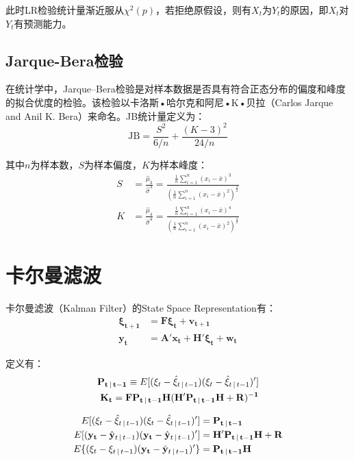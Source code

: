 \documentclass[11pt]{article}
\begin{document}
此时LR检验统计量渐近服从$\chi^2(p)$，若拒绝原假设，则有${X_t}$为${Y_t}$的原因，即${X_t}$对${Y_t}$有预测能力。

\subsection{Jarque-Bera检验}

在统计学中，Jarque–Bera检验是对样本数据是否具有符合正态分布的偏度和峰度的拟合优度的检验。该检验以卡洛斯•哈尔克和阿尼•K•贝拉（Carlos Jarque and Anil K. Bera）来命名。JB统计量定义为：
\begin{equation*}
    \text{JB} = \frac{S^2}{6/n} + \frac{(K-3)^2}{24/n}    
\end{equation*}

其中$n$为样本数，$S$为样本偏度，$K$为样本峰度：
\begin{align*}
    S &= \frac{\hat{\mu}_3}{\hat{\sigma}^3} = \frac{\frac{1}{n}\sum_{i=1}^{n}(x_i - \bar{x})^3}{\left( \frac{1}{n}\sum_{i=1}^{n}(x_i - \bar{x})^2 \right)^{\frac{3}{2}}} \\
    K &= \frac{\hat{\mu}_4}{\hat{\sigma}^4} = \frac{\frac{1}{n}\sum_{i=1}^{n}(x_i - \bar{x})^4}{\left( \frac{1}{n}\sum_{i=1}^{n}(x_i - \bar{x})^2 \right)^{\frac{4}{2}}}
\end{align*}

\section{卡尔曼滤波}

卡尔曼滤波（Kalman Filter）的State Space Representation有：
\begin{align*}
   \mathbf{\xi_{t+1}} &= \mathbf{F \xi_{t}} + \mathbf{v_{t+1}} \\
   \mathbf{y_{t}} &= \mathbf{A'} \mathbf{x_{t}} + \mathbf{H'\xi_{t}} + \mathbf{w_t}
\end{align*}

定义有：
\begin{align*}
    \mathbf{P_{t\,\vert\, t-1}} \equiv E[(\xi_{t} - \hat{\xi}_{t\,\vert\, t-1})(\xi_{t} - \hat{\xi}_{t\,\vert\, t-1})'] \\
    \mathbf{K_t} = \mathbf{FP_{t\,\vert\, t-1}H(H'P_{t\,\vert\, t-1}H+R)^{-1}}
\end{align*}

\begin{align*}
    E[(\xi_{t} - \hat{\xi}_{t\,\vert\, t-1})(\xi_{t} - \hat{\xi}_{t\,\vert\, t-1})'] &= \mathbf{P_{t\,\vert\, t-1}} \\ E[(\mathbf{y_t} - \hat{\mathbf{y}}_{t\,\vert\, t-1})(\mathbf{y_t} - \hat{\mathbf{y}}_{t\,\vert\, t-1})'] &= \mathbf{H'P_{t\,\vert\, t-1}H+R} \\
    E\{(\xi_t - \xi_{t\,\vert\, t-1})(\mathbf{y_t} - \hat{\mathbf{y}}_{t\,\vert\, t-1})'\} &= \mathbf{P_{t\,\vert\, t-1}H} \\
\end{align*}
\end{document}
